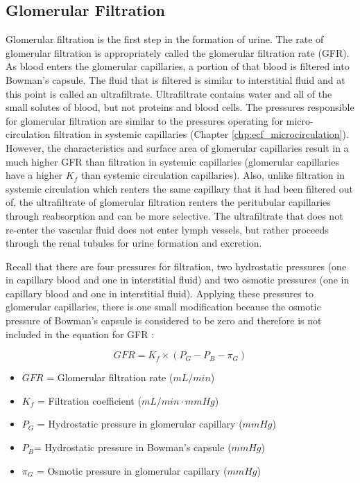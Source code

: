 \subsection{Glomerular Filtration}

Glomerular filtration is the first step in the formation of urine. The rate of glomerular filtration is appropriately called the glomerular filtration rate (GFR). As blood enters the glomerular capillaries, a portion of that blood is filtered into Bowman’s capsule. The fluid that is filtered is similar to interstitial fluid and at this point is called an ultrafiltrate. Ultrafiltrate contains water and all of the small solutes of blood, but not proteins and blood cells. The pressures responsible for glomerular filtration are similar to the pressures operating for micro-circulation filtration in systemic capillaries (Chapter \ref{chp:ecf_microcirculation}). However, the characteristics and surface area of glomerular capillaries result in a much higher GFR than filtration in systemic capillaries (glomerular capillaries have a higher $K_f$ than systemic circulation capillaries). Also, unlike filtration in systemic circulation which renters the same capillary that it had been filtered out of, the ultrafiltrate of glomerular filtration renters the peritubular capillaries through reabsorption and can be more selective. The ultrafiltrate that does not re-enter the vascular fluid does not enter lymph vessels, but rather proceeds through the renal tubules for urine formation and excretion.

Recall that there are four pressures for filtration, two hydrostatic pressures (one in capillary blood and one in interstitial fluid) and two osmotic pressures (one in capillary blood and one in interstitial fluid). Applying these pressures to glomerular capillaries, there is one small modification because the osmotic pressure of Bowman’s capsule is considered to be zero and therefore is not included in the equation for GFR \cite{costanzo_physiology_2013}:

\begin{equation}
GFR = K_f \times (P_{G} - P_{B} - \pi_{G})
\label{GFR}
\end{equation}

\begin{itemize}
\item $GFR$ = Glomerular filtration rate ($mL/min$) 
\item $K_f$ = Filtration coefficient ($mL/min \cdot mm Hg$) 
\item $P_{G}$ = Hydrostatic pressure in glomerular capillary ($mm Hg$) 
\item $P_{B} $= Hydrostatic pressure in Bowman’s capsule ($mm Hg$) 
\item $\pi_{G}$ = Osmotic pressure in glomerular capillary ($mm Hg$) 
\end{itemize} 

